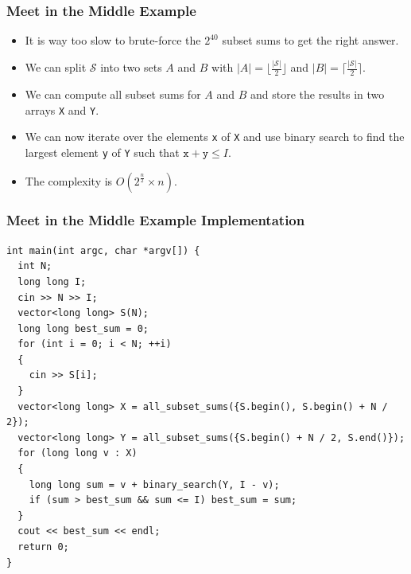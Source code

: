 \documentclass{beamer}
\begin{document}
\begin{frame}%
\frametitle{Meet in the Middle Example}

\begin{itemize}

\item It is way too slow to brute-force the $2^{40}$ subset sums to get the right answer.

\vspace{0.2cm}

\item<2-> We can split $\mathcal{S}$ into two sets $A$ and $B$ with $|A| = \lfloor \frac{|\mathcal{S}|}{2} \rfloor$
and $|B| = \lceil \frac{|\mathcal{S}|}{2} \rceil$.

\vspace{0.2cm}

\item<3-> We can compute all subset sums for $A$ and $B$ and store the results in two arrays \texttt{X} and \texttt{Y}.

\vspace{0.2cm}

\item<4-> We can now iterate over the elements \texttt{x} of \texttt{X} and use binary search to find the largest element \texttt{y} of \texttt{Y} such that
$\texttt{x} + \texttt{y} \le I$.

\vspace{0.2cm}

\item<5-> The complexity is $O(2^{\frac{n}{2}} \times n)$.

\end{itemize}

\end{frame}

\begin{frame}[containsverbatim]
\frametitle{Meet in the Middle Example Implementation}

\scriptsize

\begin{lstlisting}
int main(int argc, char *argv[]) {
  int N;
  long long I;
  cin >> N >> I;
  vector<long long> S(N);
  long long best_sum = 0;
  for (int i = 0; i < N; ++i)
  {
    cin >> S[i];
  }
  vector<long long> X = all_subset_sums({S.begin(), S.begin() + N / 2});
  vector<long long> Y = all_subset_sums({S.begin() + N / 2, S.end()});
  for (long long v : X)
  {
    long long sum = v + binary_search(Y, I - v);
    if (sum > best_sum && sum <= I) best_sum = sum;
  }
  cout << best_sum << endl;
  return 0;
}
\end{lstlisting}

\end{frame}
\end{document}
